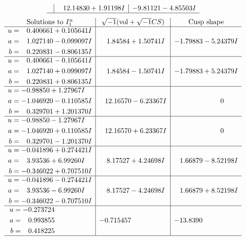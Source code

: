 \documentclass[1p]{elsarticle_modified}
\theoremstyle{definition}
\newcommand{\I}{\sqrt{-1}}
\begin{document}
$$\begin{array}{c|c|c}
 & \phantom{-}12.14830 + 1.91198 I & -9.81121 - 4.85503 I\\
 \hline 
 \end{array}$$\newpage$$\begin{array}{c|c|c}  
\text{Solutions to }I^u_{1}& \I (\text{vol} + \sqrt{-1}CS) & \text{Cusp shape}\\
 \hline 
\begin{aligned}
u &= \phantom{-}0.400661 + 0.105641 I \\
a &= \phantom{-}1.027140 - 0.099097 I \\
b &= \phantom{-}0.220831 - 0.806135 I\end{aligned}
 & \phantom{-}1.84584 + 1.50741 I & -1.79883 - 5.24379 I \\ \hline\begin{aligned}
u &= \phantom{-}0.400661 - 0.105641 I \\
a &= \phantom{-}1.027140 + 0.099097 I \\
b &= \phantom{-}0.220831 + 0.806135 I\end{aligned}
 & \phantom{-}1.84584 - 1.50741 I & -1.79883 + 5.24379 I \\ \hline\begin{aligned}
u &= -0.98850 + 1.27967 I \\
a &= -1.046920 - 0.110585 I \\
b &= \phantom{-}0.329701 + 1.201370 I\end{aligned}
 & \phantom{-}12.16570 - 6.23367 I & \phantom{-0.000000 } 0 \\ \hline\begin{aligned}
u &= -0.98850 - 1.27967 I \\
a &= -1.046920 + 0.110585 I \\
b &= \phantom{-}0.329701 - 1.201370 I\end{aligned}
 & \phantom{-}12.16570 + 6.23367 I & \phantom{-0.000000 } 0 \\ \hline\begin{aligned}
u &= -0.041896 + 0.274421 I \\
a &= \phantom{-}3.93536 + 6.99260 I \\
b &= -0.346022 + 0.707510 I\end{aligned}
 & \phantom{-}8.17527 + 4.24698 I & \phantom{-}1.66879 - 8.52198 I \\ \hline\begin{aligned}
u &= -0.041896 - 0.274421 I \\
a &= \phantom{-}3.93536 - 6.99260 I \\
b &= -0.346022 - 0.707510 I\end{aligned}
 & \phantom{-}8.17527 - 4.24698 I & \phantom{-}1.66879 + 8.52198 I \\ \hline\begin{aligned}
u &= -0.273724\phantom{ +0.000000I} \\
a &= \phantom{-}0.993855\phantom{ +0.000000I} \\
b &= \phantom{-}0.418225\phantom{ +0.000000I}\end{aligned}
 & -0.715457\phantom{ +0.000000I} & -13.8390\phantom{ +0.000000I}\\
 \hline 
 \end{array}$$\newpage\newpage\renewcommand{\arraystretch}{1}
\end{document}
